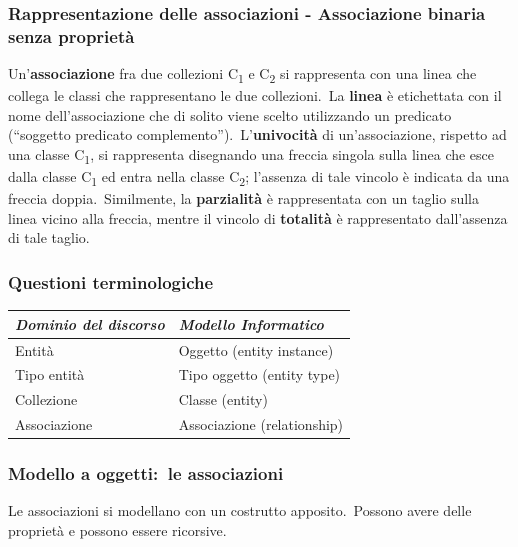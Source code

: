 \subsubsection{Rappresentazione delle associazioni - Associazione binaria senza proprietà}

Un'\textbf{associazione} fra due collezioni C\textsubscript{1} e C\textsubscript{2} si rappresenta con una linea che collega le classi che rappresentano le due collezioni.\
La \textbf{linea} è etichettata con il nome dell'associazione che di solito viene scelto utilizzando un predicato (``soggetto predicato complemento'').\
L'\textbf{univocità} di un'associazione, rispetto ad una classe C\textsubscript{1}, si rappresenta disegnando una freccia singola sulla linea che esce dalla classe C\textsubscript{1} ed entra nella classe C\textsubscript{2}; l'assenza di tale vincolo è indicata da una freccia doppia.\
Similmente, la \textbf{parzialità} è rappresentata con un taglio sulla linea vicino alla freccia, mentre il vincolo di \textbf{totalità} è rappresentato dall'assenza di tale taglio.

\subsubsection{Questioni terminologiche}

\begin{table}[H]
	\centering
	\begin{tabular}{|l|l|}
		\hline
		\textit{Dominio del discorso} & \textit{Modello Informatico} \\\hline\hline
		Entità                        & Oggetto (entity instance)    \\
		Tipo entità                   & Tipo oggetto (entity type)   \\
		Collezione                    & Classe (entity)              \\
		Associazione                  & Associazione (relationship)  \\\hline
	\end{tabular}
\end{table}

\subsubsection{Modello a oggetti:\ le associazioni}

Le associazioni si modellano con un costrutto apposito.\
Possono avere delle proprietà e possono essere ricorsive.\

